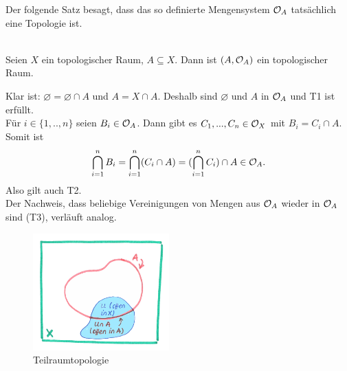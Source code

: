     Der folgende Satz besagt, dass das so definierte Mengensystem $\mathcal{O}_A$ tatsächlich eine Topologie ist.
    \begin{satz} \label{satz:trTop}\ \\
        Seien $X$ ein topologischer Raum, $A \subseteq X$. Dann ist $(A,\mathcal{O}_A)$ ein topologischer Raum.	
    \end{satz}
    \begin{bew}
        Klar ist: $\varnothing = \varnothing \cap A$ und $A = X \cap A$. 
        Deshalb sind $\varnothing$ und $A$ in $\mathcal{O}_A$ und T1 ist erfüllt.
        \\
        Für $i \in \{1, .., n\}$ seien $B_i \in \mathcal{O}_A$. 
        Dann gibt es $C_1, ..., C_n \in \mathcal{O}_X$ mit $B_i = C_i \cap A$. 
        Somit ist 
        \begin{align*}
            \bigcap_{i=1}^n B_i = \bigcap_{i=1}^n (C_i \cap A) = (\bigcap_{i=1}^n C_i) \cap A \in \mathcal{O}_A.
        \end{align*}
        Also gilt auch T2.\\
        Der Nachweis, dass beliebige Vereinigungen von Mengen aus $\mathcal{O}_A$ wieder in $\mathcal{O}_A$ sind (T3), verläuft analog.
    \end{bew}

    
    
    \begin{figure}[ht]
        \centering
        \includegraphics[height=4.5cm]{abb/teilraumtop.png}
        \caption{Teilraumtopologie}
        \label{fig:teilraumtop}
    \end{figure}
    
    
    

